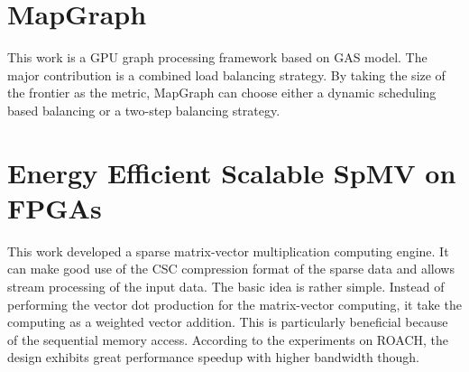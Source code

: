 \section{MapGraph}
This work \cite{fu2014mapgraph} is a GPU graph processing framework based on GAS model.
The major contribution is a combined load balancing strategy. By taking the size of
the frontier as the metric, MapGraph can choose either a dynamic scheduling
based balancing or a two-step balancing strategy.

\section{Energy Efficient Scalable SpMV on FPGAs}
This work \cite{dorrance2014scalable} developed a sparse matrix-vector multiplication computing engine. It
can make good use of the CSC compression format of the sparse data and allows
stream processing of the input data. The basic idea is rather simple. Instead of
performing the vector dot production for the matrix-vector computing, it take
the computing as a weighted vector addition. This is particularly beneficial
because of the sequential memory access. According to the experiments on ROACH,
the design exhibits great performance speedup with higher bandwidth though.
